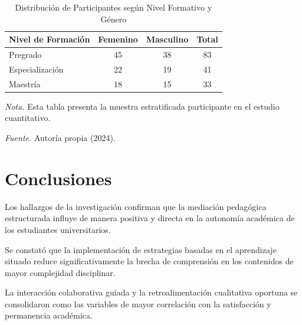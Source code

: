 \documentclass[12pt,letterpaper]{article}
\begin{document}
\begin{table}[htbp]
    \RaggedRight
    \begin{threeparttable}
        \caption{\label{tab:participantes}Distribución de Participantes según Nivel Formativo y Género}
        \begin{tabularx}{\textwidth}{l c c c}
            \toprule
            Nivel de Formación & Femenino & Masculino & Total \\
            \midrule
            Pregrado & 45 & 38 & 83 \\
            Especialización & 22 & 19 & 41 \\
            Maestría & 18 & 15 & 33 \\
            \bottomrule
        \end{tabularx}
        \vspace{4pt}
        \begin{tablenotes}[flushleft]\footnotesize
            \item \textit{Nota.} Esta tabla presenta la muestra estratificada participante en el estudio cuantitativo.
            \item \textit{Fuente.} Autoría propia (2024).
        \end{tablenotes}
    \end{threeparttable}
\end{table}

\clearpage
\section{Conclusiones}

Los hallazgos de la investigación confirman que la mediación pedagógica estructurada influye de manera positiva y directa en la autonomía académica de los estudiantes universitarios.

Se constató que la implementación de estrategias basadas en el aprendizaje situado reduce significativamente la brecha de comprensión en los contenidos de mayor complejidad disciplinar.

La interacción colaborativa guiada y la retroalimentación cualitativa oportuna se consolidaron como las variables de mayor correlación con la satisfacción y permanencia académica.
\end{document}
